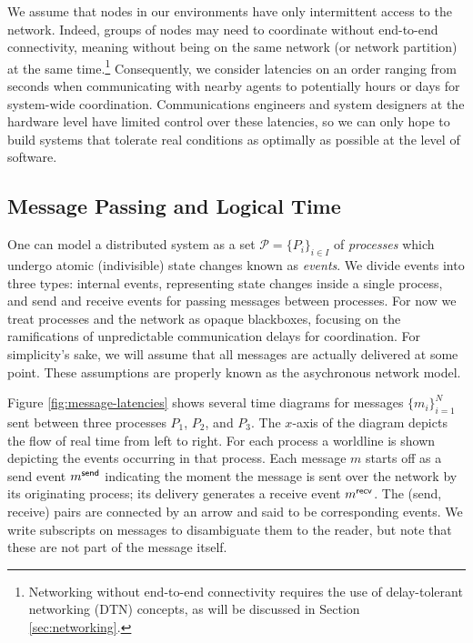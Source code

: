 \documentclass[]             %
{NASA}                       %
\theoremstyle{definition}
\begin{document}
We assume that nodes in our environments have only intermittent access
to the network. Indeed, groups of nodes may need to coordinate without
end-to-end connectivity, meaning without being on the same network (or
network partition) at the same time.\footnote{Networking without
  end-to-end connectivity requires the use of delay-tolerant
  networking (DTN) concepts, as will be discussed in Section
  \ref{sec:networking}.}  Consequently, we consider latencies on an
order ranging from seconds when communicating with nearby agents to
potentially hours or days for system-wide coordination.
Communications engineers and system designers at the hardware level
have limited control over these latencies, so we can only hope to
build systems that tolerate real conditions as optimally as possible
at the level of software.

\subsection{Message Passing and Logical Time}
\label{ssec:message-passing}
One can model a distributed system as a set
\(\mathcal{P} = \{P_i\}_{i\in I}\) of \emph{processes} which undergo
atomic (indivisible) state changes known as \emph{events}. We divide
events into three types: internal events, representing state changes
inside a single process, and send and receive events for passing
messages between processes. For now we treat processes and the network
as opaque blackboxes, focusing on the ramifications of unpredictable
communication delays for coordination.  For simplicity's sake, we will
assume that all messages are actually delivered at some point. These
assumptions are properly known as the asychronous network model.

Figure \ref{fig:message-latencies} shows several time diagrams for
messages $\{m_i\}_{i=1}^N$ sent between three processes $P_1$, $P_2$,
and $P_3$. The $x$-axis of the diagram depicts the flow of real time
from left to right. For each process a worldline is shown depicting
the events occurring in that process. Each message $m$ starts off as a
send event $m_{}^{\mathsf{send}}$ indicating the moment the message is sent over
the network by its originating process; its delivery generates a
receive event $m_{}^{\mathsf{recv}}$. The (send, receive) pairs are connected by
an arrow and said to be corresponding events. We write subscripts on
messages to disambiguate them to the reader, but note that these are
not part of the message itself.
\end{document}
